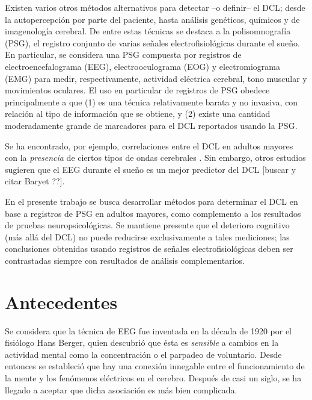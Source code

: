 \documentclass[12pt,letterpaper,draft]{book}
\begin{document}
Existen varios otros métodos alternativos para detectar --o definir-- el DCL; desde la autopercepción por parte del paciente, hasta análisis genéticos, químicos y de imagenología cerebral.
%
De entre estas técnicas se destaca a la polisomnografía (PSG), el registro conjunto de varias señales electrofisiológicas durante el sueño.
%
En particular, se considera una PSG compuesta por registros de electroencefalograma (EEG), electrooculograma (EOG) y electromiograma (EMG) para medir, respectivamente, actividad eléctrica cerebral, tono muscular y movimientos oculares.
%
El uso en particular de registros de PSG obedece principalmente a que (1) es una técnica relativamente barata y no invasiva, con relación al tipo de información que se obtiene, y (2) existe una cantidad moderadamente grande de marcadores para el DCL reportados usando la PSG.

Se ha encontrado, por ejemplo, correlaciones entre el DCL en adultos mayores con la \textit{presencia} de ciertos tipos de ondas cerebrales \cite{babiloni13,prichep94,prichep06}.
%
Sin embargo, otros estudios sugieren que el EEG durante el sueño es un mejor predictor del DCL [buscar y citar Baryet ??].

En el presente trabajo se busca desarrollar métodos para determinar el DCL en base a registros de PSG en adultos mayores, como complemento a los resultados de pruebas neuropsicológicas.
%
Se mantiene presente que el deterioro cognitivo (más allá del DCL) no puede reducirse exclusivamente a tales mediciones; las conclusiones obtenidas usando registros de señales electrofisiológicas deben ser contrastadas siempre con resultados de análisis complementarios.


\section*{Antecedentes}

Se considera que la técnica de EEG fue inventada en la década de 1920 por el fisiólogo Hans Berger, quien descubrió que ésta es \textit{sensible} a cambios en la actividad mental como la concentración o el parpadeo de voluntario.
%
Desde entonces se estableció que hay una conexión innegable entre el funcionamiento de la mente y los fenómenos eléctricos en el cerebro.
%
Después de casi un siglo, se ha llegado a aceptar que dicha asociación es más bien complicada.
\end{document}
